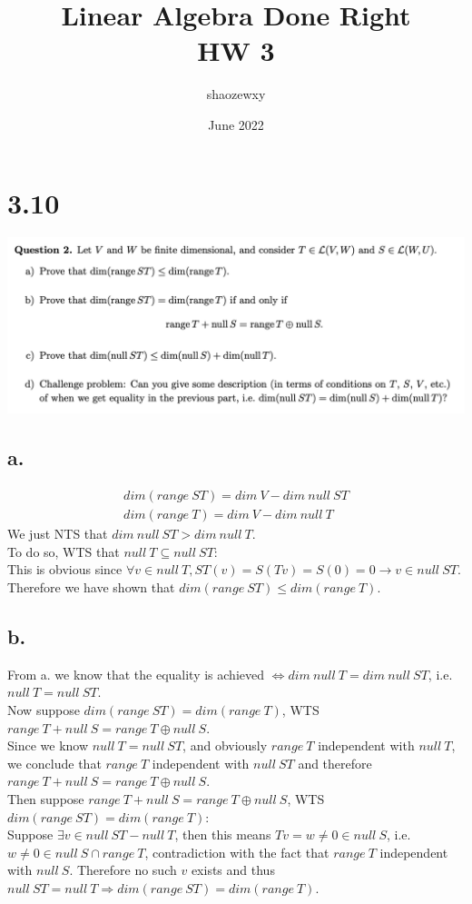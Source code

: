 \documentclass{article}
\title{Linear Algebra Done Right\\
\large{HW 3}}
\author{shaozewxy }
\date{June 2022}
\begin{document}
\maketitle

\setcounter{secnumdepth}{0}
\section*{3.10}
\includegraphics*[scale=0.5]{q3_2.png}
\subsection*{a.}
\begin{equation*}
    \begin{split}
        dim(range\ ST) = dim\ V - dim\ null\ ST\\
        dim(range\ T) = dim\ V - dim\ null\ T
    \end{split}
\end{equation*}
We just NTS that $dim\ null\ ST > dim\ null\ T$.\\
To do so, WTS that $null\ T \subseteq null\ ST$:\\
This is obvious since $\forall v \in null\ T, ST(v) = S(Tv) = S(0) = 0 \rightarrow v \in null\ ST$.\\
Therefore we have shown that $dim(range\ ST) \leq dim(range\ T)$.
\subsection*{b.}
From a. we know that the equality is achieved $\iff dim\ null\ T = dim\ null\ ST$, i.e. $null\ T = null\ ST$.\\
Now suppose $dim(range\ ST) = dim(range\ T)$, WTS $range\ T + null\ S = range\ T \oplus null\ S$.\\
Since we know $null\ T = null\ ST$, and obviously $range\ T$ independent with $null\ T$, we conclude that $range\ T$ independent with $null\ ST$ and therefore $range\ T + null\ S = range\ T \oplus null\ S$.\\
Then suppose $range\ T + null\ S = range\ T \oplus null\ S$, WTS $dim(range\ ST) = dim(range\ T)$:\\
Suppose $\exists v \in null\ ST - null\ T$, then this means $Tv = w \neq 0 \in null\ S$, i.e. $w \neq 0 \in null\ S \cap range\ T$, contradiction with the fact that $range\ T$ independent with $null\ S$. Therefore no such $v$ exists and thus $null\ ST = null\ T \Rightarrow dim(range\ ST) = dim(range\ T)$.
\end{document}
